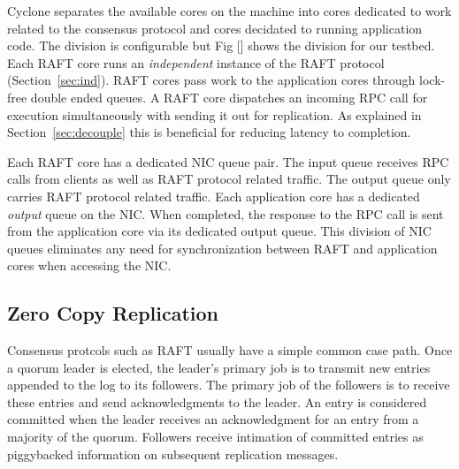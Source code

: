 \documentclass[twocolumn]{article}
\begin{document}
Cyclone separates the available cores on the machine into cores dedicated to
work related to the consensus protocol and cores decidated to running
application code. The division is configurable but Fig [] shows the division for
our testbed. Each RAFT core runs an \emph{independent} instance of the RAFT
protocol (Section~\ref{sec:ind}). RAFT cores pass work to the application cores
through lock-free double ended queues. A RAFT core dispatches an incoming RPC
call for execution simultaneously with sending it out for replication. As
explained in Section~\ref{sec:decouple} this is beneficial for reducing latency
to completion. 

Each RAFT core has a dedicated NIC queue pair. The input queue receives RPC
calls from clients as well as RAFT protocol related traffic. The output queue
only carries RAFT protocol related traffic. Each application core has a
dedicated \emph{output} queue on the NIC. When completed, the response to the
RPC call is sent from the application core via its dedicated output queue. This
division of NIC queues eliminates any need for synchronization between RAFT and
application cores when accessing the NIC.

\subsection{Zero Copy Replication}
Consensus protcols such as RAFT usually have a simple common case path. Once a
quorum leader is elected, the leader's primary job is to transmit new entries
appended to the log to its followers. The primary job of the followers is to
receive these entries and send acknowledgments to the leader. An entry is
considered committed when the leader receives an acknowledgment for an entry
from a majority of the quorum. Followers receive intimation of committed entries
as piggybacked information on subsequent replication messages.
\end{document}

